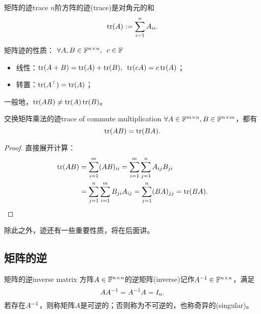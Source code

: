 \begin{definition}{矩阵的迹}{trace}
	$n$阶方阵的迹(trace)是对角元的和
	\begin{equation}
		\operatorname{tr}(A):=\sum_{i=1}^nA_{ii}.
	\end{equation}
\end{definition}
\begin{corollary}
	矩阵迹的性质：%
	$\forall A,B\in\mathbb F^{n\times n},\enspace c\in\mathbb F$
    \begin{itemize}
    	\item 线性：$\operatorname{tr}(A+B)=\operatorname{tr}(A)+\operatorname{tr}(B),\enspace \operatorname{tr}(cA)=c\operatorname{tr}(A)$；
    	\item 转置：$\operatorname{tr}(A^\top)=\operatorname{tr}(A)$；
    \end{itemize}
\end{corollary}
\begin{remark}
	一般地，$\operatorname{tr}(AB)\neq\operatorname{tr}(A)\operatorname{tr}(B)$。
\end{remark}
\begin{theorem}{交换矩阵乘法的迹}{trace of commute multiplication}
	$\forall A\in\mathbb F^{m\times n},B\in\mathbb F^{n\times m}$，都有
	\begin{equation}
		\operatorname{tr}(AB)=\operatorname{tr}(BA).
	\end{equation}
\end{theorem}
\begin{proof}
	直接展开计算：
	\begin{align*}
		\operatorname{tr}(AB)&=\sum_{i=1}^m(AB)_{ii}=\sum_{i=1}^m\sum_{j=1}^nA_{ij}B_{ji}\\
		&=\sum_{j=1}^n\sum_{i=1}^mB_{ji}A_{ij}=\sum_{j=1}^n(BA)_{jj}=\operatorname{tr}(BA).
		\qedhere
	\end{align*}
\end{proof}

\begin{remark}
	除此之外，迹还有一些重要性质，将在后面讲。
\end{remark}

\subsection{矩阵的逆}

\begin{definition}{矩阵的逆}{inverse matrix}
	方阵$A\in\mathbb F^{n\times n}$的逆矩阵(inverse)记作$A^{-1}\in\mathbb F^{n\times n}$，满足
	\[
		AA^{-1}=A^{-1} A=I_n.
	\]
	若存在$A^{-1}$，则称矩阵$A$是可逆的；否则称为不可逆的，也称奇异的(singular)。
\end{definition}

